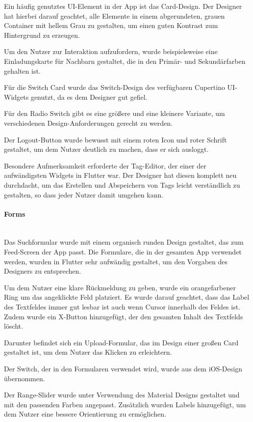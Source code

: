 Ein häufig genutztes UI-Element in der App ist das Card-Design. Der Designer hat hierbei darauf geachtet, alle Elemente in einem abgerundeten, grauen Container mit hellem Grau zu gestalten, um einen guten Kontrast zum Hintergrund zu erzeugen.

Um den Nutzer zur Interaktion aufzufordern, wurde beispielsweise eine Einladungskarte für Nachbarn gestaltet, die in den Primär- und Sekundärfarben gehalten ist.

Für die Switch Card wurde das Switch-Design des verfügbaren Cupertino UI-Widgets genutzt, da es dem Designer gut gefiel.

Für den Radio Switch gibt es eine größere und eine kleinere Variante, um verschiedenen Design-Anforderungen gerecht zu werden.

Der Logout-Button wurde bewusst mit einem roten Icon und roter Schrift gestaltet, um dem Nutzer deutlich zu machen, dass er sich ausloggt.

Besondere Aufmerksamkeit erforderte der Tag-Editor, der einer der aufwändigsten Widgets in Flutter war. Der Designer hat diesen komplett neu durchdacht, um das Erstellen und Abspeichern von Tags leicht verständlich zu gestalten, so dass jeder Nutzer damit umgehen kann.

\paragraph{Forms}\mbox{} \\
Das Suchformular wurde mit einem organisch runden Design gestaltet, das zum Feed-Screen der App passt. Die Formulare, die in der gesamten App verwendet werden, wurden in Flutter sehr aufwändig gestaltet, um den Vorgaben des Designers zu entsprechen.

Um dem Nutzer eine klare Rückmeldung zu geben, wurde ein
orangefarbener Ring um das angeklickte Feld platziert. Es
wurde darauf geachtet, dass das Label des Textfeldes immer
gut lesbar ist auch wenn Cursor innerhalb des Feldes
ist. Zudem wurde ein X-Button hinzugefügt, der den gesamten
Inhalt des Textfelds löscht.

Darunter befindet sich ein Upload-Formular, das im Design einer großen Card gestaltet ist, um dem Nutzer das Klicken zu erleichtern.

Der Switch, der in den Formularen verwendet wird, wurde aus dem iOS-Design übernommen.

Der Range-Slider wurde unter Verwendung des Material Designs gestaltet und mit den passenden Farben angepasst. Zusätzlich wurden Labels hinzugefügt, um dem Nutzer eine bessere Orientierung zu ermöglichen.

